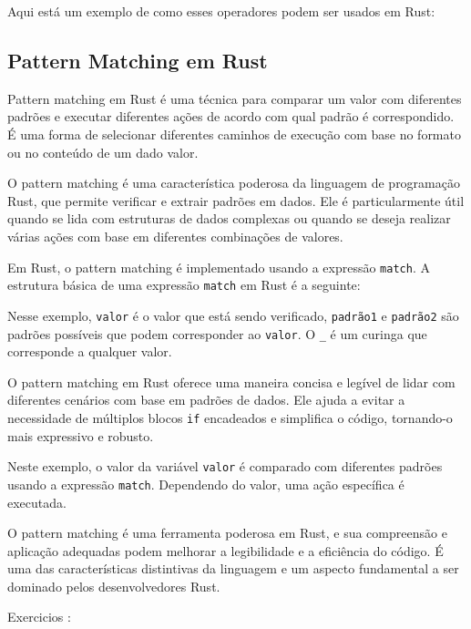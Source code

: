 \documentclass[12pt,a4paper,oneside]{abntex2}
\begin{document}
Aqui está um exemplo de como esses operadores podem ser usados em Rust:




\subsection{Pattern Matching em Rust}
Pattern matching em Rust é uma técnica para comparar um valor com diferentes padrões e executar diferentes ações de acordo com qual padrão é correspondido. É uma forma de selecionar diferentes caminhos de execução com base no formato ou no conteúdo de um dado valor.

O pattern matching é uma característica poderosa da linguagem de programação Rust, que permite verificar e extrair padrões em dados. Ele é particularmente útil quando se lida com estruturas de dados complexas ou quando se deseja realizar várias ações com base em diferentes combinações de valores.

Em Rust, o pattern matching é implementado usando a expressão \texttt{match}. A estrutura básica de uma expressão \texttt{match} em Rust é a seguinte:



Nesse exemplo, \texttt{valor} é o valor que está sendo verificado, \texttt{padrão1} e \texttt{padrão2} são padrões possíveis que podem corresponder ao \texttt{valor}. O \texttt{\_} é um curinga que corresponde a qualquer valor.

O pattern matching em Rust oferece uma maneira concisa e legível de lidar com diferentes cenários com base em padrões de dados. Ele ajuda a evitar a necessidade de múltiplos blocos \texttt{if} encadeados e simplifica o código, tornando-o mais expressivo e robusto.




Neste exemplo, o valor da variável \texttt{valor} é comparado com diferentes padrões usando a expressão \texttt{match}. Dependendo do valor, uma ação específica é executada.

O pattern matching é uma ferramenta poderosa em Rust, e sua compreensão e aplicação adequadas podem melhorar a legibilidade e a eficiência do código. É uma das características distintivas da linguagem e um aspecto fundamental a ser dominado pelos desenvolvedores Rust.

Exercicios :
\end{document}
